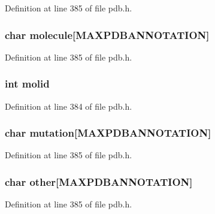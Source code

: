 Definition at line 385 of file pdb.\-h.

\hypertarget{struct__compnd_aaa2c1f2957c0b08a914fe7a09abb1318}{
\subsubsection[{molecule}]{\setlength{\rightskip}{0pt plus 5cm}char molecule\mbox{[}{\bf M\-A\-X\-P\-D\-B\-A\-N\-N\-O\-T\-A\-T\-I\-O\-N}\mbox{]}}}\label{struct__compnd_aaa2c1f2957c0b08a914fe7a09abb1318}


Definition at line 385 of file pdb.\-h.

\hypertarget{struct__compnd_ae2b837562f7605f66a1c7817a1c820ef}{
\subsubsection[{molid}]{\setlength{\rightskip}{0pt plus 5cm}int molid}}\label{struct__compnd_ae2b837562f7605f66a1c7817a1c820ef}


Definition at line 384 of file pdb.\-h.

\hypertarget{struct__compnd_a69171cd20bd13efd3797554a1d417642}{
\subsubsection[{mutation}]{\setlength{\rightskip}{0pt plus 5cm}char mutation\mbox{[}{\bf M\-A\-X\-P\-D\-B\-A\-N\-N\-O\-T\-A\-T\-I\-O\-N}\mbox{]}}}\label{struct__compnd_a69171cd20bd13efd3797554a1d417642}


Definition at line 385 of file pdb.\-h.

\hypertarget{struct__compnd_a493c1799fb4b2c44a49be047341dc2aa}{
\subsubsection[{other}]{\setlength{\rightskip}{0pt plus 5cm}char other\mbox{[}{\bf M\-A\-X\-P\-D\-B\-A\-N\-N\-O\-T\-A\-T\-I\-O\-N}\mbox{]}}}\label{struct__compnd_a493c1799fb4b2c44a49be047341dc2aa}


Definition at line 385 of file pdb.\-h.

